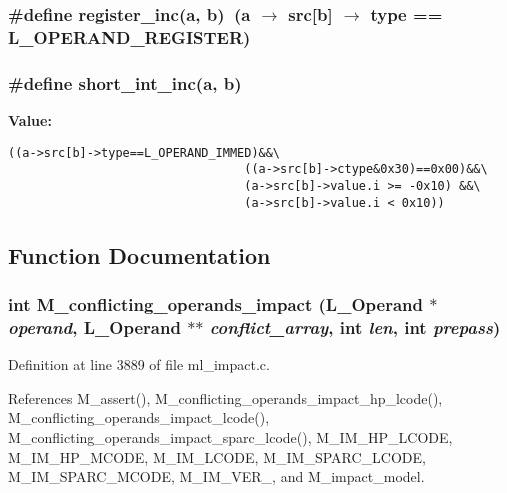 \subsubsection{\setlength{\rightskip}{0pt plus 5cm}\#define register\_\-inc(a, b)~(a $\rightarrow$ src[b] $\rightarrow$ type == L\_\-OPERAND\_\-REGISTER)}\label{ml__impact_8c_1e7b7d7ff33cab42b74ae66e888b1124}


\subsubsection{\setlength{\rightskip}{0pt plus 5cm}\#define short\_\-int\_\-inc(a, b)}\label{ml__impact_8c_beca719e984ec0dc73106055269cd986}


\textbf{Value:}

\begin{Code}\begin{verbatim}((a->src[b]->type==L_OPERAND_IMMED)&&\
                                 ((a->src[b]->ctype&0x30)==0x00)&&\
                                 (a->src[b]->value.i >= -0x10) &&\
                                 (a->src[b]->value.i < 0x10))
\end{verbatim}\end{Code}


\subsection{Function Documentation}
\subsubsection{\setlength{\rightskip}{0pt plus 5cm}int M\_\-conflicting\_\-operands\_\-impact (L\_\-Operand $\ast$ {\em operand}, L\_\-Operand $\ast$$\ast$ {\em conflict\_\-array}, int {\em len}, int {\em prepass})}\label{ml__impact_8c_e740f1408e76772a425f3deb201be249}




Definition at line 3889 of file ml\_\-impact.c.

References M\_\-assert(), M\_\-conflicting\_\-operands\_\-impact\_\-hp\_\-lcode(), M\_\-conflicting\_\-operands\_\-impact\_\-lcode(), M\_\-conflicting\_\-operands\_\-impact\_\-sparc\_\-lcode(), M\_\-IM\_\-HP\_\-LCODE, M\_\-IM\_\-HP\_\-MCODE, M\_\-IM\_\-LCODE, M\_\-IM\_\-SPARC\_\-LCODE, M\_\-IM\_\-SPARC\_\-MCODE, M\_\-IM\_\-VER\_, and M\_\-impact\_\-model.

